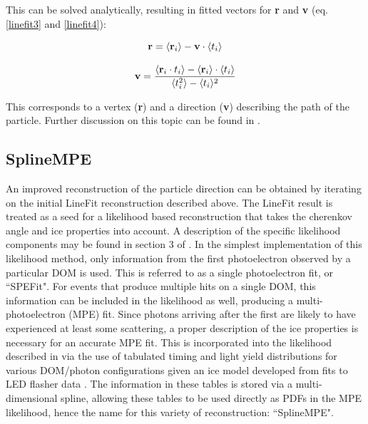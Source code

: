This can be solved analytically, resulting in fitted vectors for \textbf{r} and \textbf{v} (eq. \ref{linefit3} and \ref{linefit4}):

\begin{equation}
    \textbf r = \langle \textbf r_i \rangle - \textbf v \cdot \langle t_i \rangle
    \label{linefit3}
\end{equation}

\begin{equation}
    \textbf v = \frac{\langle \textbf r_i \cdot t_i \rangle - \langle \textbf r_i \rangle \cdot \langle t_i \rangle }{\langle t_i^2 \rangle - \langle t_i \rangle^2}
    \label{linefit4}
\end{equation}

This corresponds to a vertex (\textbf{r}) and a direction (\textbf{v}) describing the path of the particle. Further discussion on this topic can be found in \cite{track_reco_paper}.

\subsection{SplineMPE}
An improved reconstruction of the particle direction can be obtained by iterating on the initial LineFit reconstruction described above. The LineFit result is treated as a seed for a likelihood based reconstruction that takes the cherenkov angle and ice properties into account. A description of the specific likelihood components may be found in section 3 of \cite{track_reco_paper}. In the simplest implementation of this likelihood method, only information from the first photoelectron observed by a particular DOM is used. This is referred to as a single photoelectron fit, or ``SPEFit". For events that produce multiple hits on a single DOM, this information can be included in the likelihood as well, producing a multi-photoelectron (MPE) fit. Since photons arriving after the first are likely to have experienced at least some scattering, a proper description of the ice properties is necessary for an accurate MPE fit. This is incorporated into the likelihood described in \cite{track_reco_paper} via the use of tabulated timing and light yield distributions for various DOM/photon configurations given an ice model developed from fits to LED flasher data \cite{icemodel_paper}. The information in these tables is stored via a multi-dimensional spline, allowing these tables to be used directly as PDFs in the MPE likelihood, hence the name for this variety of reconstruction: ``SplineMPE".

